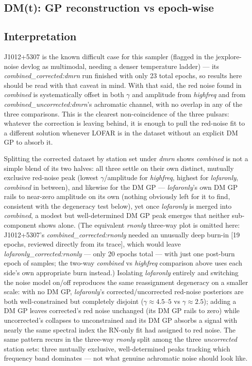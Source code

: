 \subsection{DM(t): GP reconstruction vs epoch-wise}

\subsection{Interpretation}

J1012+5307 is the known difficult case for this sampler (flagged in the
jexplore-noise devlog as multimodal, needing a denser temperature ladder) ---
its \emph{combined\_corrected:dmrn} run finished with only 23 total epochs,
so results here should be read with that caveat in mind. With that said, the
red noise found in \emph{combined} is systematically offset in both $\gamma$
and amplitude from \emph{highfreq} and from \emph{combined\_uncorrected:dmrn}'s
achromatic channel, with no overlap in any of the three comparisons. This is
the clearest non-coincidence of the three pulsars: whatever the correction is
leaving behind, it is enough to pull the red-noise fit to a different
solution whenever LOFAR is in the dataset without an explicit DM GP to
absorb it.

Splitting the corrected dataset by station set under \emph{dmrn} shows
\emph{combined} is not a simple blend of its two halves: all three settle
on their own distinct, mutually exclusive red-noise peak (lowest
$\gamma$/amplitude for \emph{highfreq}, highest for \emph{lofaronly},
\emph{combined} in between), and likewise for the DM GP --- \emph{lofaronly}'s
own DM GP rails to near-zero amplitude on its own (nothing obviously left
for it to find, consistent with the degeneracy test below), yet once
\emph{lofaronly} is merged into \emph{combined}, a modest but
well-determined DM GP peak emerges that neither sub-component shows alone.
(The equivalent \emph{rnonly} three-way plot is omitted here: J1012+5307's
\emph{combined\_corrected:rnonly} needed an unusually deep burn-in
[19 epochs, reviewed directly from its trace], which would leave
\emph{lofaronly\_corrected:rnonly} --- only 20 epochs total --- with just
one post-burn epoch of samples; the two-way \emph{combined} vs
\emph{highfreq} comparison above uses each side's own appropriate burn
instead.) Isolating \emph{lofaronly} entirely and switching the noise model
on/off reproduces the same reassignment degeneracy on a smaller scale: with
no DM GP, \emph{lofaronly}'s corrected/uncorrected red-noise posteriors are
both well-constrained but completely disjoint ($\gamma\approx4.5$--$5$ vs
$\gamma\approx2.5$); adding a DM GP leaves corrected's red noise unchanged
(its DM GP rails to zero) while uncorrected's collapses to unconstrained
and its DM GP absorbs a signal with nearly the same spectral index the
RN-only fit had assigned to red noise. The same pattern recurs in the
three-way \emph{rnonly} split among the three \emph{uncorrected} station
sets: three mutually exclusive, well-determined peaks tracking which
frequency band dominates --- not what genuine achromatic noise should look
like.

